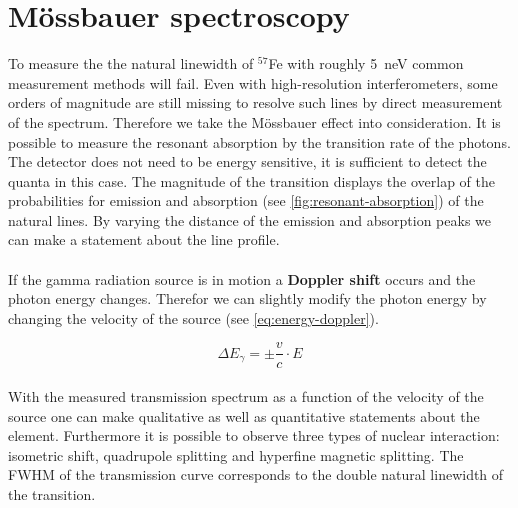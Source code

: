 
\section{Mössbauer spectroscopy}
\label{sec:mössbauer-spectroscopy}

To measure the the natural linewidth of $^{57}$Fe with roughly \SI{5}{\nano\electronvolt} common measurement methods will fail. Even with high-resolution interferometers, some orders of magnitude are still missing to resolve such lines by direct measurement of the spectrum. 
Therefore we take the Mössbauer effect into consideration. It is possible to measure the resonant absorption by the transition rate of the photons. 
The detector does not need to be energy sensitive, it is sufficient to detect the quanta in this case. The magnitude of the transition displays the overlap of the probabilities for emission and absorption (see \autoref{fig:resonant-absorption}) of the natural lines. 
By varying the distance of the emission and absorption peaks we can make a statement about the line profile. \\
\\
If the gamma radiation source is in motion a \textbf{Doppler shift} occurs and the photon energy changes. Therefor we can slightly modify the photon energy by changing the velocity of the source (see  \autoref{eq:energy-doppler}). 

\begin{equation}
    \Delta E_{\gamma} = \pm \frac{v}{c} \cdot E
    \label{eq:energy-doppler}
\end{equation}
\\
With the measured transmission spectrum as a function of the velocity of the source one can make qualitative as well as quantitative statements about the element. 
Furthermore it is possible to observe three types of nuclear interaction: isometric shift, quadrupole splitting and hyperfine magnetic splitting. 
The FWHM of the transmission curve corresponds to the double natural linewidth of the transition.
